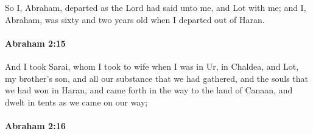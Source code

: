 			So I, Abraham, departed as the Lord had said unto me, and Lot with me; and I, Abraham, was sixty and two years old when I departed out of Haran.


		\paragraph{Abraham 2:15} %
			\label{ABRAHAM-2-15}

			And I took Sarai, whom I took to wife when I was in Ur, in Chaldea, and Lot, my brother's son, and all our substance that we had gathered, and the souls that we had won in Haran, and came forth in the way to the land of Canaan, and dwelt in tents as we came on our way;


		\paragraph{Abraham 2:16} %
			\label{ABRAHAM-2-16}

